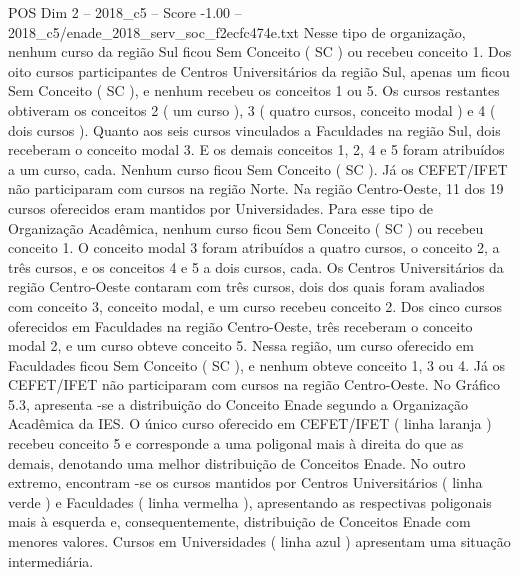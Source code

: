 \begin{textsample}{POS Dim 2 – 2018\_c5 – Score -1.00 – 2018\_c5/enade\_2018\_serv\_soc\_f2ecfc474e.txt}
Nesse tipo de organização, nenhum curso da região Sul ficou Sem Conceito ( SC ) ou recebeu conceito 1.
Dos oito cursos participantes de Centros Universitários da região Sul, apenas um ficou Sem Conceito ( SC ), e nenhum recebeu os conceitos 1 ou 5.
Os cursos restantes obtiveram os conceitos 2 ( um curso ), 3 ( quatro cursos, conceito modal ) e 4 ( dois cursos ).
Quanto aos seis cursos vinculados a Faculdades na região Sul, dois receberam o conceito modal 3.
E os demais conceitos 1, 2, 4 e 5 foram atribuídos a um curso, cada.
Nenhum curso ficou Sem Conceito ( SC ).
Já os CEFET/IFET não participaram com cursos na região Norte.
Na região Centro-Oeste, 11 dos 19 cursos oferecidos eram mantidos por Universidades.
Para esse tipo de Organização Acadêmica, nenhum curso ficou Sem Conceito ( SC ) ou recebeu conceito 1.
O conceito modal 3 foram atribuídos a quatro cursos, o conceito 2, a três cursos, e os conceitos 4 e 5 a dois cursos, cada.
Os Centros Universitários da região Centro-Oeste contaram com três cursos, dois dos quais foram avaliados com conceito 3, conceito modal, e um curso recebeu conceito 2.
Dos cinco cursos oferecidos em Faculdades na região Centro-Oeste, três receberam o conceito modal 2, e um curso obteve conceito 5.
Nessa região, um curso oferecido em Faculdades ficou Sem Conceito ( SC ), e nenhum obteve conceito 1, 3 ou 4.
Já os CEFET/IFET não participaram com cursos na região Centro-Oeste.
No Gráfico 5.3, apresenta -se a distribuição do Conceito Enade segundo a Organização Acadêmica da IES.
O único curso oferecido em CEFET/IFET ( linha laranja ) recebeu conceito 5 e corresponde a uma poligonal mais à direita do que as demais, denotando uma melhor distribuição de Conceitos Enade.
No outro extremo, encontram -se os cursos mantidos por Centros Universitários ( linha verde ) e Faculdades ( linha vermelha ), apresentando as respectivas poligonais mais à esquerda e, consequentemente, distribuição de Conceitos Enade com menores valores.
Cursos em Universidades ( linha azul ) apresentam uma situação intermediária.

\end{textsample}
